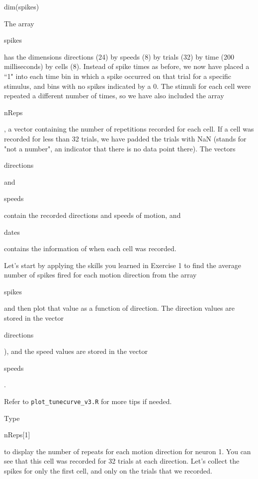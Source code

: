 \documentclass[
letterpaper, %
11pt, %
 oneside, 
onecolumn, %
]{memoir}
\numberwithin{Exercise}{chapter}
\begin{document}
\begin{shortrcode}
dim(spikes)
\end{shortrcode}   

The array \begin{ttfamily}spikes\end{ttfamily} has the dimensions directions (24) by speeds (8) by trials (32) by time (200 milliseconds) by cells (8).   Instead of spike times as before, we now have placed a ``1" into each time bin in which a spike occurred on that trial for a specific stimulus, and bins with no spikes indicated by a 0. The stimuli for each cell were repeated a different number of times, so we have also included the array \begin{ttfamily}nReps\end{ttfamily}, a vector containing the number of repetitions recorded for each cell.  If a cell was recorded for less than 32 trials, we have padded the trials with NaN (stands for "not a number", an indicator that there is no data point there). The vectors \begin{ttfamily}directions\end{ttfamily} and \begin{ttfamily}speeds\end{ttfamily} contain the recorded directions and speeds of motion, and \begin{ttfamily}dates\end{ttfamily} contains the information of when each cell was recorded.


Let's start by applying the skills you learned in Exercise 1 to find the average number of spikes fired for each motion direction from the array \begin{ttfamily}spikes\end{ttfamily} and then plot that value as a function of direction.  The direction values are stored in the vector \begin{ttfamily}directions\end{ttfamily}), and the speed values are stored in the vector \begin{ttfamily}speeds\end{ttfamily}.   

Refer to \verb+plot_tunecurve_v3.R+ for more tips if needed. 

Type

\begin{shortrcode}
nReps[1]
\end{shortrcode}   

to display the number of repeats for each motion direction for neuron 1.  You can see that this cell was recorded for 32 trials at each direction. Let's collect the spikes for only the first cell, and only on the trials that we recorded.  
\end{document}

